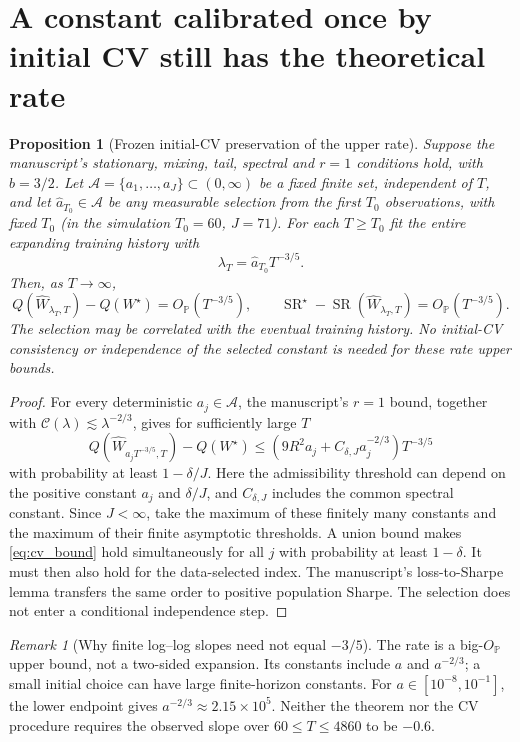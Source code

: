 \documentclass[11pt,a4paper]{article}
\newtheorem{proposition}[theorem]{Proposition}
\theoremstyle{remark}
\newtheorem{remark}[theorem]{Remark}
\newcommand{\SR}{\operatorname{SR}}
\begin{document}
\section{A constant calibrated once by initial CV still has the theoretical rate}
\begin{proposition}[Frozen initial-CV preservation of the upper rate]\label{prop:cv}
Suppose the manuscript's stationary, mixing, tail, spectral and $r=1$ conditions hold, with $b=3/2$. Let $\mathcal A=\{a_1,\ldots,a_J\}\subset(0,\infty)$ be a fixed \emph{finite} set, independent of $T$, and let $\widehat a_{T_0}\in\mathcal A$ be any measurable selection from the first $T_0$ observations, with fixed $T_0$ (in the simulation $T_0=60$, $J=71$). For each $T\ge T_0$ fit the entire expanding training history with
\[
\lambda_T=\widehat a_{T_0}T^{-3/5}.
\]
Then, as $T\to\infty$,
\begin{equation}\label{eq:cv_rate}
 Q(\widehat W_{\lambda_T,T})-Q(W^\star)=O_{\mathbb P}(T^{-3/5}),
 \qquad
 \SR^\star-\SR(\widehat W_{\lambda_T,T})=O_{\mathbb P}(T^{-3/5}).
\end{equation}
The selection may be correlated with the eventual training history. No initial-CV consistency or independence of the selected constant is needed for these \emph{rate upper bounds}.
\end{proposition}
\begin{proof}
For every deterministic $a_j\in\mathcal A$, the manuscript's $r=1$ bound, together with $\mathcal C(\lambda)\lesssim\lambda^{-2/3}$, gives for sufficiently large $T$
\begin{equation}\label{eq:cv_bound}
 Q(\widehat W_{a_jT^{-3/5},T})-Q(W^\star)
 \le\left(9R^2a_j+C_{\delta,J}a_j^{-2/3}\right)T^{-3/5}
\end{equation}
with probability at least $1-\delta/J$. Here the admissibility threshold can depend on the positive constant $a_j$ and $\delta/J$, and $C_{\delta,J}$ includes the common spectral constant. Since $J<\infty$, take the maximum of these finitely many constants and the maximum of their finite asymptotic thresholds. A union bound makes \eqref{eq:cv_bound} hold simultaneously for all $j$ with probability at least $1-\delta$. It must then also hold for the data-selected index. The manuscript's loss-to-Sharpe lemma transfers the same order to positive population Sharpe. The selection does not enter a conditional independence step.
\end{proof}

\begin{remark}[Why finite log--log slopes need not equal $-3/5$]
The rate is a big-$O_{\mathbb P}$ upper bound, not a two-sided expansion. Its constants include $a$ and $a^{-2/3}$; a small initial choice can have large finite-horizon constants. For $a\in[10^{-8},10^{-1}]$, the lower endpoint gives $a^{-2/3}\approx2.15\times10^5$. Neither the theorem nor the CV procedure requires the observed slope over $60\le T\le4860$ to be $-0.6$.
\end{remark}
\end{document}
